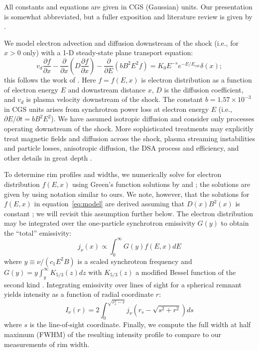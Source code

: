 \documentclass[iop, apj, numberedappendix]{emulateapj}
\newcommand*{\mt}{\mathrm}
\newcommand*{\ptl}{\partial}
\newcommand*{\Ecut}{E_{\mt{cut}}}
\begin{document}
All constants and equations are given in CGS (Gaussian) units.  Our
presentation is somewhat abbreviated, but a fuller exposition and literature
review is given by .

We model electron advection and diffusion downstream of the shock (i.e., for
$x>0$ only) with a 1-D steady-state plane transport equation:
\begin{equation} \label{eq:model}
    v_d \frac{\ptl f}{\ptl x}
    - \frac{\ptl}{\ptl x} \left(D\frac{\ptl f}{\ptl x}\right)
    - \frac{\ptl}{\ptl E} \left(bB^2E^2f\right)
    = K_0 E^{-s} e^{-E/\Ecut} \delta(x) ;
\end{equation}
this follows the work of \citet{webb1984, berezhko2004, cassam-chenai2007,
morlino2010, rettig2012}.  Here $f = f(E,x)$ is electron distribution as a
function of electron energy $E$ and downstream distance $x$, $D$ is the
diffusion coefficient, and $v_d$ is plasma velocity downstream of the shock.
The constant $b = 1.57 \times 10^{-3}$ in CGS units arises from synchrotron
power loss at electron energy $E$ (i.e., $\ptl E/\ptl t = b B^2 E^2$).
We have assumed isotropic diffusion and consider only processes operating
downstream of the shock.  More sophisticated treatments may explicitly treat
magnetic fields and diffusion across the shock, plasma streaming instabilities
and particle losses, anisotropic diffusion, the DSA process and efficiency, and
other details in great depth \citep[e.g.,][and references therein]{reville2013,
bykov2014, ferrand2014}.

To determine rim profiles and widths, we numerically solve for electron
distribution $f(E,x)$ using Green's function solutions by \citet{lerche1980}
and \citet{rettig2012}; the solutions are given by 
using notation similar to ours.  We note, however, that the solutions for
$f(E,x)$ in equation~\eqref{eq:model} are derived assuming that $D(x) B^2(x)$
is constant \citep{lerche1980}; we will revisit this assumption further below.
The electron distribution may be integrated over the one-particle synchrotron
emissivity $G(y)$ to obtain the ``total'' emissivity:
\begin{equation} \label{eq:emissivity}
    j_{\nu}(x) \propto \int_0^\infty G(y) f(E,x) dE
\end{equation}
where $y \equiv \nu/(c_1 E^2 B)$ is a scaled synchrotron frequency and
$G(y) = y \int_y^\infty K_{5/3}(z) dz$ with $K_{5/3}(z)$ a modified Bessel
function of the second kind \citep{pacholczyk1970}.  Integrating emissivity
over lines of sight for a spherical remnant yields intensity as a function of
radial coordinate $r$:
\begin{equation} \label{eq:intensity}
    I_{\nu}(r) = 2 \int_0^{\sqrt{r_s^2 - r}}
                   j_{\nu} \left( r_s - \sqrt{s^2 + r^2} \right) ds
\end{equation}
where $s$ is the line-of-sight coordinate.  Finally, we compute the full width
at half maximum (FWHM) of the resulting intensity profile to compare to our
measurements of rim width.
\end{document}
